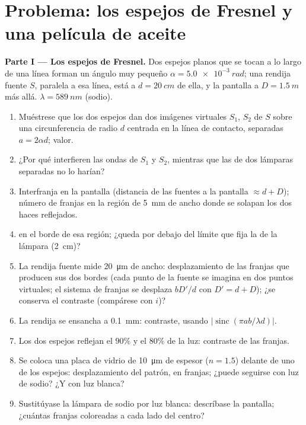 \section{Problema: los espejos de Fresnel y una película de aceite}

\begin{problem}
\label{pb:b2:two-wave-interference:1}

\medskip
\noindent\textbf{Parte I --- Los espejos de Fresnel.}
Dos espejos planos que se tocan a lo largo de una línea forman un ángulo muy pequeño $\alpha =
\qty{5.0e-3}{rad}$; una rendija fuente $S$, paralela a esa línea, está a $d =
\qty{20}{cm}$ de ella, y la pantalla a $D = \qty{1.5}{m}$ más allá. $\lambda =
\qty{589}{nm}$ (sodio).
\begin{enumerate}
  \item Muéstrese que los dos espejos dan dos imágenes virtuales $S_1$, $S_2$ de
        $S$ sobre una circunferencia de radio $d$ centrada en la línea de contacto,
        separadas $a = 2\alpha d$; valor.
  \item ¿Por qué interfieren las ondas de $S_1$ y $S_2$, mientras que las de
        dos lámparas separadas no lo harían?
  \item Interfranja en la pantalla (distancia de las fuentes a la
        pantalla $\approx d + D$); número de franjas en la región de
        \qty{5}{mm} de ancho donde se solapan los dos haces reflejados.
  \item {} en el borde de esa región; ¿queda por debajo
        del límite que fija la  de la lámpara (\qty{2}{cm})?
  \item La rendija fuente mide \qty{20}{\micro m} de ancho: desplazamiento de las franjas
        que producen sus dos bordes (cada punto de la fuente se imagina en dos
        puntos virtuales; el sistema de franjas se desplaza $bD'/d$ con $D' =
        d + D$); ¿se conserva el contraste (compárese con $i$)?
  \item La rendija se ensancha a \qty{0.1}{mm}: contraste, usando
        $|\operatorname{sinc}(\pi ab/\lambda d)|$.
  \item Los dos espejos reflejan el $90\%$ y el $80\%$ de la luz: contraste
        de las franjas.
  \item Se coloca una placa de vidrio de \qty{10}{\micro m} de espesor ($n = 1.5$)
        delante de uno de los espejos: desplazamiento del patrón, en franjas; ¿puede
        seguirse con luz de sodio? ¿Y con luz blanca?
  \item Sustitúyase la lámpara de sodio por luz blanca: descríbase la pantalla;
        ¿cuántas franjas coloreadas a cada lado del centro?
\end{enumerate}


\end{problem}
